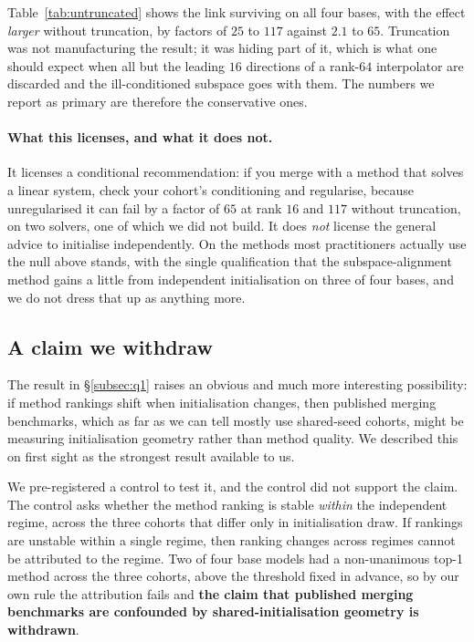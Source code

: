 Table~\ref{tab:untruncated} shows the link surviving on all four bases, with the effect \emph{larger}
without truncation, by factors of $25$ to $117$ against $2.1$ to $65$.
Truncation was not manufacturing the result; it was hiding part of it,
which is what one should expect when all but the leading $16$ directions
of a rank-$64$ interpolator are discarded and the ill-conditioned subspace
goes with them. The numbers we report as primary are therefore the
conservative ones.

\paragraph{What this licenses, and what it does not.} It licenses a
conditional recommendation: if you merge with a method that solves a
linear system, check your cohort's conditioning and regularise, because
unregularised it can fail by a factor of $65$ at rank $16$ and $117$
without truncation, on two solvers, one of which we did not build. It does
\emph{not} license the general advice to initialise independently. On the
methods most practitioners actually use the null above stands, with the
single qualification that the subspace-alignment method gains a little
from independent initialisation on three of four bases, and we do not
dress that up as anything more.

\subsection{A claim we withdraw}
\label{subsec:withdrawn}

The result in \S\ref{subsec:q1} raises an obvious and much more
interesting possibility: if method rankings shift when initialisation
changes, then published merging benchmarks, which as far as we can tell
mostly use shared-seed cohorts, might be measuring initialisation
geometry rather than method quality. We described this on first sight as
the strongest result available to us.

We pre-registered a control to test it, and the control did not support
the claim. The control asks whether the method ranking is stable
\emph{within} the independent regime, across the three cohorts that
differ only in initialisation draw. If rankings are unstable within a
single regime, then ranking changes across regimes cannot be attributed
to the regime. Two of four base models had a non-unanimous top-1 method
across the three cohorts, above the threshold fixed in advance, so by our
own rule the attribution fails and \textbf{the claim that published
merging benchmarks are confounded by shared-initialisation geometry is
withdrawn}.

